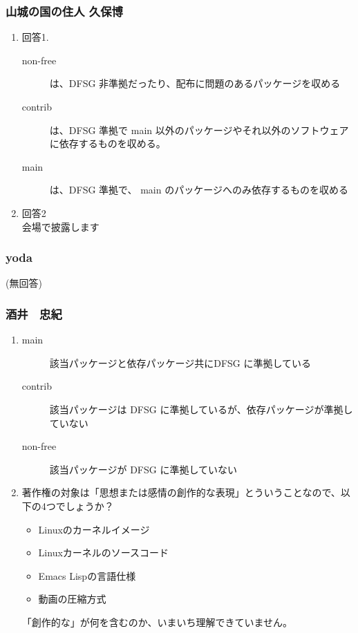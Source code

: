 \documentclass[cjk,dvipdfmx,10pt,%
hyperref={bookmarks=true,bookmarksnumbered=true,bookmarksopen=false,%
colorlinks=false,%
pdftitle={第 58 回 関西 Debian 勉強会},%
pdfauthor={倉敷・のがた・河田・佐々木},%
pdfsubject={資料},%
}]{beamer}
\begin{document}
\begin{frame}
\frametitle{ 山城の国の住人 久保博 }
  \begin{enumerate}
  \item 回答1.
    \begin{description}
    \item [non-free]は、DFSG 非準拠だったり、配布に問題のあるパッケージを収める
    \item [contrib]は、DFSG 準拠で main 以外のパッケージやそれ以外のソフトウェアに依存するものを収める。
    \item [main]は、DFSG 準拠で、 main のパッケージへのみ依存するものを収める
    \end{description}
  \item 回答2\\
    会場で披露します
  \end{enumerate}
\end{frame}

\begin{frame}
\frametitle{ yoda }
  (無回答)
\end{frame}

\begin{frame}
\frametitle{ 酒井　忠紀 }
  \begin{enumerate}
  \item
    \begin{description}
    \item [main] 該当パッケージと依存パッケージ共にDFSG に準拠している
    \item [contrib] 該当パッケージは DFSG に準拠しているが、依存パッケージが準拠していない
    \item [non-free] 該当パッケージが DFSG に準拠していない
    \end{description}
  \item 著作権の対象は「思想または感情の創作的な表現」とういうことなので、以下の4つでしょうか？
    \begin{itemize}
    \item Linuxのカーネルイメージ
    \item Linuxカーネルのソースコード
    \item Emacs Lispの言語仕様
    \item 動画の圧縮方式
    \end{itemize}
        「創作的な」が何を含むのか、いまいち理解できていません。
  \end{enumerate}
\end{frame}
\end{document}
